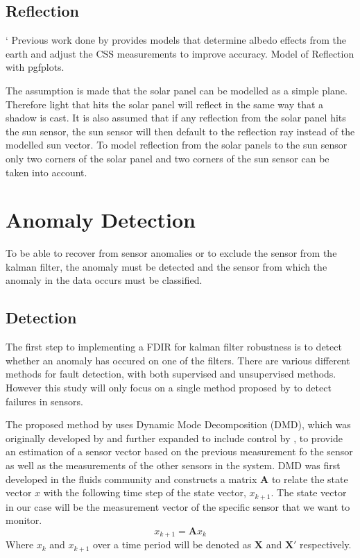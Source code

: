 \documentclass[letterpaper, 10 pt, conference]{ieeeconf}  %
\begin{document}
\subsection{Reflection}`
Previous work done by \textcite{Cilden-Guler2021} provides models that determine albedo effects from the earth and adjust the CSS measurements to improve accuracy.
Model of Reflection with pgfplots.

The assumption is made that the solar panel can be modelled as a simple plane. Therefore light that hits the solar panel will reflect in the same way that a shadow is cast. It is also assumed that if any reflection from the solar panel hits the sun sensor, the sun sensor will then default to the reflection ray instead of the modelled sun vector. To model reflection from the solar panels to the sun sensor only two corners of the solar panel and two corners of the sun sensor can be taken into account. 

\section{Anomaly Detection}
To be able to recover from sensor anomalies or to exclude the sensor from the kalman filter, the anomaly must be detected and the sensor from which the anomaly in the data occurs must be classified.

\subsection{Detection}
The first step to implementing a FDIR for kalman filter robustness is to detect whether an anomaly has occured on one of the filters. There are various different methods for fault detection, with both supervised and unsupervised methods. However this study will only focus on a single method proposed by \textcite{DeSilva2020} to detect failures in sensors.

The proposed method by \textcite{DeSilva2020} uses Dynamic Mode Decomposition (DMD), which was originally developed by \textcite{schmid2011applications} and further expanded to include control by \textcite{proctor2016dynamic}, to provide an estimation of a sensor vector based on the previous measurement fo the sensor as well as the measurements of the other sensors in the system. DMD was first developed in the fluids community and constructs a matrix $\mathbf{A}$ to relate the state vector $x$ with the following time step of the state vector, $x_{k+1}$. The state vector in our case will be the measurement vector of the specific sensor that we want to monitor.
\begin{equation}
	x_{k+1} = \mathbf{A}x_k
\end{equation}
Where $x_k$ and $x_{k+1}$ over a time period will be denoted as $\mathbf{X}$ and $\mathbf{X'}$ respectively.
\end{document}
